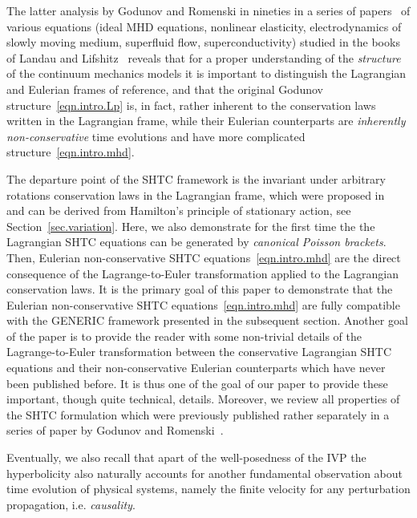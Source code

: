 \documentclass[twoside]{article}
\newcommand{\IP}[1]{ \textcolor{blue}   {\small\texttt{
\texttt{[image: pin\_small.jpeg]} Ilya: #1}} }
\newcommand{\MP}[1]{ \textcolor{Green}   {\small\texttt{
\texttt{[image: pin\_small.jpeg]} Michal: #1}} }
\begin{document}
The latter analysis by Godunov and Romenski in nineties in a series of 
papers~\cite{GodRom1995,GodRom1996,GodRom1996a,GodRom1998,GodRom1998,Rom2001,Romenski2002,GodRom2003} of various equations (ideal MHD equations, nonlinear 
elasticity, 
electrodynamics of slowly moving medium, superfluid flow, superconductivity) 
studied in the 
books of Landau and Lifshitz~\cite{Landau1984electrodynamics,Landau-Lifshitz6} 
reveals that for a proper understanding of the \textit{structure} of the 
continuum 
mechanics models it is important to distinguish the Lagrangian and Eulerian 
frames of reference, and that the original Godunov 
structure~\eqref{eqn.intro.Lp} is, in 
fact, rather inherent to the conservation laws written in the Lagrangian frame, 
while their Eulerian counterparts are \textit{inherently non-conservative} time 
evolutions and have more complicated structure~\eqref{eqn.intro.mhd}.


The departure point of the SHTC framework is the invariant under arbitrary 
rotations conservation 
laws in the Lagrangian frame, which were proposed in~\cite{GodRom1996a} and 
can be derived from Hamilton's principle of stationary action, see 
Section~\ref{sec.variation}. Here, we also demonstrate for the first 
time the the Lagrangian SHTC equations can be generated by \textit{canonical 
Poisson 
brackets}. Then, Eulerian non-conservative SHTC 
equations~\eqref{eqn.intro.mhd} are the direct consequence of the 
Lagrange-to-Euler transformation applied to the Lagrangian conservation laws. 
It is the primary goal of this paper to demonstrate that the Eulerian 
non-conservative SHTC equations~\eqref{eqn.intro.mhd} are fully compatible with 
the GENERIC framework presented in the subsequent section. 
Another goal of the paper is to provide the reader with some non-trivial 
details of the Lagrange-to-Euler transformation between the conservative 
Lagrangian SHTC equations and their non-conservative Eulerian counterparts 
which have never been published before. It is thus one of the goal of our paper 
to 
provide these important, though quite technical, details. Moreover, we review 
all properties of the SHTC formulation which were previously published rather 
separately in a series of paper by Godunov and 
Romenski~\cite{GodRom1995,GodRom1996,GodRom1996a,GodRom1998,GodRom1998,Rom2001,Romenski2002,GodRom2003}.

Eventually, we also recall that apart of the well-posedness of the IVP the 
hyperbolicity also naturally accounts for another fundamental observation about 
time evolution of physical 
systems, namely the finite
velocity for any perturbation propagation, i.e. \textit{causality}.
\end{document}

